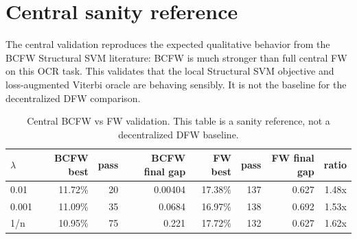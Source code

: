 \documentclass[11pt,a4paper]{article}
\begin{document}
\begin{table}[htbp]
\centering
\caption{Decentralized DBCFW vs DFW matched by nearest training-oracle budget. Lower test error is better.}
\label{tab:decentralized}
\end{table}

\section{Central sanity reference}

The central validation reproduces the expected qualitative behavior from the BCFW Structural SVM literature: BCFW is much stronger than full central FW on this OCR task. This validates that the local Structural SVM objective and loss-augmented Viterbi oracle are behaving sensibly. It is not the baseline for the decentralized DFW comparison.

\begin{table}[htbp]
\centering
\caption{Central BCFW vs FW validation. This table is a sanity reference, not a decentralized DFW baseline.}
\begin{tabular}{lrrrrrrr}
\toprule
\(\lambda\) & BCFW best & pass & BCFW final gap & FW best & pass & FW final gap & ratio \\
\midrule
0.01  & 11.72\% & 20 & 0.00404 & 17.38\% & 137 & 0.627 & 1.48x \\
0.001 & 11.09\% & 35 & 0.0684  & 16.97\% & 138 & 0.692 & 1.53x \\
1/n   & 10.95\% & 75 & 0.221   & 17.72\% & 132 & 0.627 & 1.62x \\
\bottomrule
\end{tabular}
\label{tab:central}
\end{table}
\end{document}
